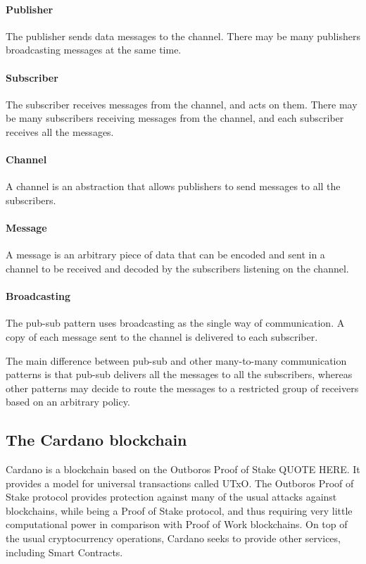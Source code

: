 \documentclass{article}
\begin{document}
\paragraph{Publisher}
The publisher sends data messages to the channel. There may be many publishers broadcasting messages at the same time.

\paragraph{Subscriber}
The subscriber receives messages from the channel, and acts on them. There may be many subscribers receiving messages from the channel, and each subscriber receives all the messages.

\paragraph{Channel}
A channel is an abstraction that allows publishers to send messages to all the subscribers.

\paragraph{Message}
A message is an arbitrary piece of data that can be encoded and sent in a channel to be received and decoded by the subscribers listening on the channel.

\paragraph{Broadcasting}
The pub-sub pattern uses broadcasting as the single way of communication. A copy of each message sent to the channel is delivered to each subscriber.

The main difference between pub-sub and other many-to-many communication patterns is that pub-sub delivers all the messages to all the subscribers, whereas other patterns may decide to route the messages to a restricted group of receivers based on an arbitrary policy.

\subsection{The Cardano blockchain}
Cardano is a blockchain based on the Outboros Proof of Stake {QUOTE HERE}. It provides a model for universal transactions called UTxO. The Outboros Proof of Stake protocol provides protection against many of the usual attacks against blockchains, while being a Proof of Stake protocol, and thus requiring very little computational power in comparison with Proof of Work blockchains. On top of the usual cryptocurrency operations, Cardano seeks to provide other services, including Smart Contracts.
\end{document}
